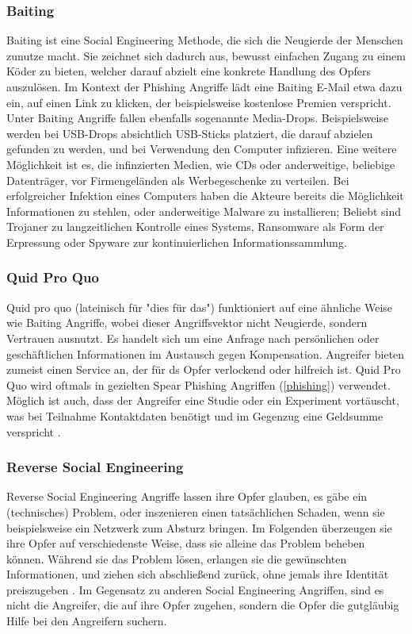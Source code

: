 \subsubsection{Baiting}
\label{baiting}
Baiting ist eine Social Engineering Methode, die sich die Neugierde der Menschen zunutze macht.
Sie zeichnet sich dadurch aus, bewusst einfachen Zugang zu einem Köder zu bieten, welcher darauf abzielt eine konkrete Handlung
des Opfers auszulösen. Im Kontext der Phishing Angriffe lädt eine Baiting E-Mail etwa dazu ein, auf einen Link zu klicken, der beispielsweise
kostenlose Premien verspricht. Unter Baiting Angriffe fallen ebenfalls sogenannte Media-Drops. Beispielsweise werden bei USB-Drops absichtlich
USB-Sticks platziert, die darauf abzielen gefunden zu werden, und bei Verwendung den Computer infizieren. Eine weitere Möglichkeit ist es, die
infinzierten Medien, wie CDs oder anderweitige, beliebige Datenträger, vor Firmengeländen als Werbegeschenke zu verteilen. Bei erfolgreicher Infektion eines Computers haben die Akteure bereits
die Möglichkeit Informationen zu stehlen, oder anderweitige Malware zu installieren; Beliebt sind Trojaner zu langzeitlichen Kontrolle eines
Systems, Ransomware als Form der Erpressung  oder Spyware zur kontinuierlichen Informationssammlung.

\subsubsection{Quid Pro Quo}
Quid pro quo (lateinisch für "dies für das") funktioniert auf eine ähnliche Weise wie Baiting Angriffe, wobei dieser Angriffsvektor nicht
Neugierde, sondern Vertrauen ausnutzt. Es handelt sich um eine Anfrage nach persönlichen oder geschäftlichen Informationen im Austausch gegen Kompensation.
Angreifer bieten zumeist einen Service an, der für ds Opfer verlockend oder hilfreich ist. Quid Pro Quo wird oftmals in gezielten
Spear Phishing Angriffen (\autoref{phishing}) verwendet. Möglich ist auch, dass der Angreifer eine Studie oder ein Experiment vortäuscht, was bei Teilnahme Kontaktdaten
benötigt und im Gegenzug eine Geldsumme verspricht .

\subsubsection{Reverse Social Engineering}
Reverse Social Engineering Angriffe lassen ihre Opfer glauben, es gäbe ein (technisches) Problem, oder inszenieren einen tatsächlichen Schaden, wenn sie beispielsweise
ein Netzwerk zum Absturz bringen. Im Folgenden überzeugen sie ihre Opfer auf verschiedenste Weise, dass sie alleine das Problem beheben können. Während sie das Problem
lösen, erlangen sie die gewünschten Informationen, und ziehen sich abschließend zurück, ohne jemals ihre Identität preiszugeben .
Im Gegensatz zu anderen Social Engineering Angriffen, sind es nicht die Angreifer, die auf ihre Opfer zugehen, sondern die Opfer die gutgläubig Hilfe
bei den Angreifern suchern.

